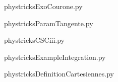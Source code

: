     

    \clearpage
    


    \newcommand{\CaptionFigExoCourone}{<+Type your caption here+>}
    \begin{center}
        
    \end{center}
    phystricksExoCourone.py

    

    \clearpage
    


    \newcommand{\CaptionFigParamTangente}{<+Type your caption here+>}
    \begin{center}
        
    \end{center}
    phystricksParamTangente.py

    

    \clearpage
    


    \newcommand{\CaptionFigCSCiii}{<+Type your caption here+>}
    \begin{center}
        
    \end{center}
    phystricksCSCiii.py

    

    \clearpage
    


    \newcommand{\CaptionFigExampleIntegration}{<+Type your caption here+>}
    \begin{center}
        
    \end{center}
    phystricksExampleIntegration.py

    

    \clearpage
    


    \newcommand{\CaptionFigDefinitionCartesiennes}{<+Type your caption here+>}
    \begin{center}
        
    \end{center}
    phystricksDefinitionCartesiennes.py

    

    \clearpage
    

